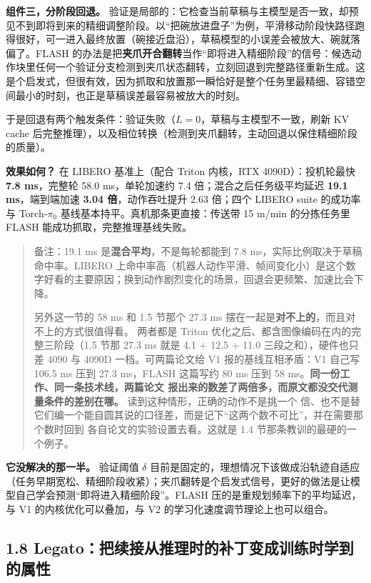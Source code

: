 \documentclass[
  chinese,
]{ctexart}
\begin{document}
\textbf{组件三，分阶段回退。}
验证是局部的：它检查当前草稿与主模型是否一致，却预见不到即将到来的精细调整阶段。以``把碗放进盘子''为例，平滑移动阶段快路径跑得很好，可一进入最终放置（碗接近盘沿），草稿模型的小误差会被放大、碗就落偏了。FLASH
的办法是把\textbf{夹爪开合翻转}当作``即将进入精细阶段''的信号：候选动作块里任何一个验证分支检测到夹爪状态翻转，立刻回退到完整路径重新生成。这是个启发式，但很有效，因为抓取和放置那一瞬恰好是整个任务里最精细、容错空间最小的时刻，也正是草稿误差最容易被放大的时刻。

于是回退有两个触发条件：验证失败（\(L = 0\)，草稿与主模型不一致，刷新 KV
cache
后完整推理），以及相位转换（检测到夹爪翻转，主动回退以保住精细阶段的质量）。

\textbf{效果如何？} 在 LIBERO 基准上（配合 Triton 内核，RTX
4090D）：投机轮最快 \textbf{7.8 ms}，完整轮 58.0 ms，单轮加速约 7.4
倍；混合之后任务级平均延迟 \textbf{19.1 ms}，端到端加速 \textbf{3.04
倍}，动作吞吐提升 2.63 倍；四个 LIBERO suite 的成功率与 Torch-\(\pi_0\)
基线基本持平。真机那条更直接：传送带 15 m/min 的分拣任务里 FLASH
能成功抓取，完整推理基线失败。

\begin{quote}
备注：19.1 ms 是\textbf{混合平均}，不是每轮都能到 7.8
ms，实际比例取决于草稿命中率。LIBERO
上命中率高（机器人动作平滑、帧间变化小）是这个数字好看的主要原因；换到动作剧烈变化的场景，回退会更频繁、加速比会下降。

另外这一节的 58 ms 和 1.5 节那个 27.3 ms
摆在一起是\textbf{对不上的}，而且对不上的方式很值得看。 两者都是 Triton
优化之后、都含图像编码在内的完整三阶段（1.5 节那 27.3 ms 就是 4.1 + 12.5
+ 11.0 三段之和），硬件也只差 4090 与 4090D 一档。可两篇论文给 V1
报的基线互相矛盾：V1 自己写 106.5 ms 压到 27.3 ms，FLASH 这篇写约 80 ms
压到 58 ms。\textbf{同一份工作、同一条技术线，两篇论文
报出来的数差了两倍多，而原文都没交代测量条件的差别在哪。}
读到这种情形，正确的动作不是挑一个
信、也不是替它们编一个能自圆其说的口径差，而是记下``这两个数不可比''，并在需要那个数时回到
各自论文的实验设置去看。这就是 1.4 节那条教训的最硬的一个例子。
\end{quote}

\textbf{它没解决的那一半。} 验证阈值 \(\delta\)
目前是固定的，理想情况下该做成沿轨迹自适应（任务早期宽松、精细阶段收紧）；夹爪翻转是个启发式信号，更好的做法是让模型自己学会预测``即将进入精细阶段''。FLASH
压的是重规划频率下的平均延迟，与 V1 的内核优化可以叠加，与 V2
的学习化速度调节理论上也可以组合。

\subsection{1.8
Legato：把续接从推理时的补丁变成训练时学到的属性}\label{legatoux628aux7eedux63a5ux4eceux63a8ux7406ux65f6ux7684ux8865ux4e01ux53d8ux6210ux8badux7ec3ux65f6ux5b66ux5230ux7684ux5c5eux6027}
\end{document}
